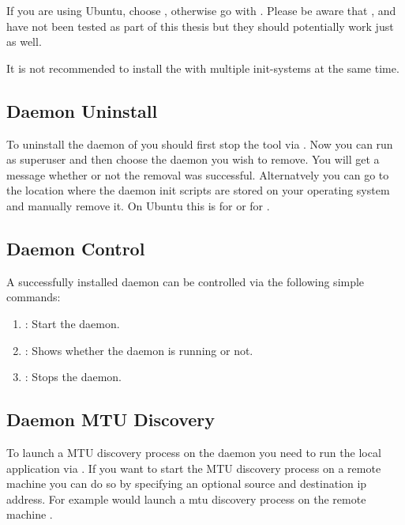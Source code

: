 If you are using Ubuntu, choose , otherwise go with . Please be aware that , and  have not been tested as part of this thesis but they should potentially work just as well.

It is not recommended to install the \entool{} with multiple init-systems at the same time.

\subsection{Daemon Uninstall}
To uninstall the daemon of \entool{} you should first stop the tool via . Now you can run  as superuser and then choose the daemon you wish to remove. You will get a message whether or not the removal was successful. Alternatvely you can go to the location where the daemon init scripts are stored on your operating system and manually remove it. On Ubuntu this is  for  or  for .

\subsection{Daemon Control}
A successfully installed daemon can be controlled via the following simple commands:

\begin{enumerate}
  \item {}: Start the daemon.
  \item {}: Shows whether the daemon is running or not.
  \item {}: Stops the daemon.
\end{enumerate}

\subsection{Daemon MTU Discovery}
To launch a \acs{MTU} discovery process on the daemon you need to run the local application via . If you want to start the \acs{MTU} discovery process on a remote machine you can do so by specifying an optional source and destination ip address. For example  would launch a mtu discovery process on the remote machine .

